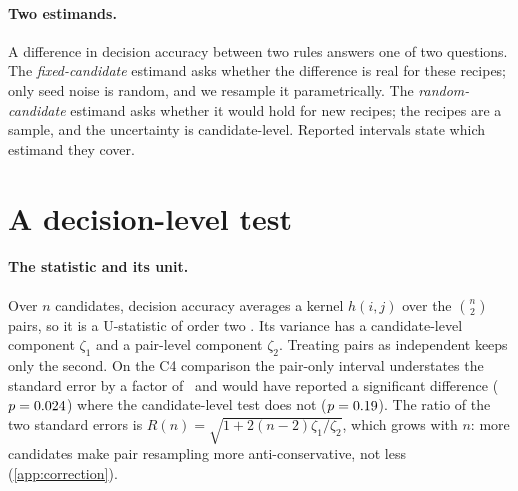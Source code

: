 \documentclass{article}
\begin{document}
\paragraph{Two estimands.} A difference in decision accuracy between two rules
answers one of two questions. The \emph{fixed-candidate} estimand asks whether
the difference is real for these recipes; only seed noise is random, and we
resample it parametrically. The \emph{random-candidate} estimand asks whether
it would hold for new recipes; the recipes are a sample, and the uncertainty is
candidate-level. Reported intervals state which estimand they cover.

\section{A decision-level test}
\label{sec:test}

\paragraph{The statistic and its unit.} Over $n$ candidates, decision accuracy
averages a kernel $h(i,j)$ over the $\binom{n}{2}$ pairs, so it is a  %
U-statistic of order two \citep{hoeffding1948class}. Its variance has a
candidate-level component $\zeta_1$ and a pair-level component $\zeta_2$.
Treating pairs as independent keeps only the second. On the C4 comparison the
pair-only interval understates the standard error by a factor of
\dependenceFactor\ and would have reported a significant difference
($p=0.024$) where the candidate-level test does not
($p=0.19$). The ratio of the two standard errors is
$R(n)=\sqrt{1+2(n-2)\zeta_1/\zeta_2}$, which grows with $n$: more candidates  %
make pair resampling more anti-conservative, not less
(\cref{app:correction}).
\end{document}
